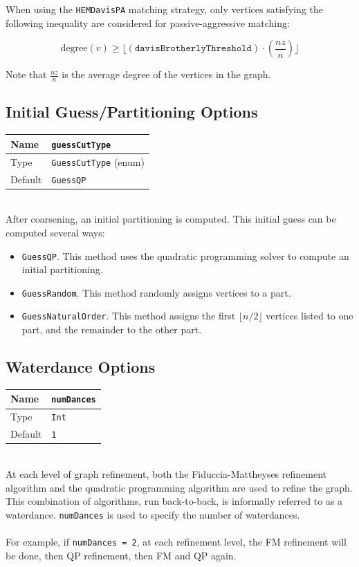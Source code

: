 \documentclass[letter]{article}
\begin{document}
When using the \texttt{HEMDavisPA} matching strategy, only vertices satisfying the following inequality are considered for passive-aggressive matching:

\[
\text{degree}(v) \geq \lfloor(\texttt{davisBrotherlyThreshold}) \cdot \left(\frac{nz}{n}\right)\rfloor
\]

Note that $\frac{nz}{n}$ is the average degree of the vertices in the graph.

\subsection{Initial Guess/Partitioning Options}

\begin{tabular}{|l|l|} \hline
Name & \texttt{guessCutType} \\ \hline
Type & \texttt{GuessCutType} (enum) \\ \hline
Default & \texttt{GuessQP} \\ \hline
\end{tabular}\\

After coarsening, an initial partitioning is computed. This initial guess can be computed several ways:

\begin{itemize}
\item \texttt{GuessQP}. This method uses the quadratic programming solver to compute an initial partitioning.
\item \texttt{GuessRandom}. This method randomly assigns vertices to a part.
\item \texttt{GuessNaturalOrder}. This method assigns the first $\lfloor n/2 \rfloor$ vertices listed to one part, and the remainder to the other part.
\end{itemize}

\subsection{Waterdance Options}
\begin{tabular}{|l|l|} \hline
Name & \texttt{numDances} \\ \hline
Type & \texttt{Int} \\ \hline
Default & \texttt{1} \\ \hline
\end{tabular}\\
                      
At each level of graph refinement, both the Fiduccia-Mattheyses refinement algorithm and the quadratic programming algorithm are used to refine the graph. This combination of algorithms, run back-to-back, is informally referred to as a waterdance. \texttt{numDances} is used to specify the number of waterdances.\\
\\
For example, if \texttt{numDances = 2}, at each refinement level, the FM refinement will be done, then QP refinement, then FM and QP again.
\end{document}
